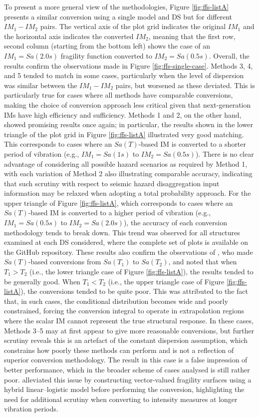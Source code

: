 To present a more general view of the methodologies, Figure \ref{fig:ffs-listA} presents a similar conversion using a single model and \ac{DS} but for different $IM_1-IM_2$ pairs. The vertical axis of the plot grid indicates the original $IM_1$ and the horizontal axis indicates the converted $IM_2$, meaning that the first row, second column (starting from the bottom left) shows the case of an $IM_1=Sa(2.0s)$ fragility function converted to $IM_2=Sa(0.5s)$. Overall, the results confirm the observations made in Figure \ref{fig:ffs-single-case}. Methods 3, 4, and 5 tended to match in some cases, particularly when the level of dispersion was similar between the $IM_1-IM_2$ pairs, but worsened as these deviated. This is particularly true for cases where all methods have comparable conversions, making the choice of conversion approach less critical given that next-generation IMs have high efficiency and sufficiency. Methods 1 and 2, on the other hand, showed promising results once again; in particular, the results shown in the lower triangle of the plot grid in Figure \ref{fig:ffs-listA} illustrated very good matching. This corresponds to cases where an $Sa(T)$-based \ac{IM} is converted to a shorter period of vibration (e.g., $IM_1=Sa(1s)$ to $IM_2=Sa(0.5s)$). There is no clear advantage of considering all possible hazard scenarios as required by Method 1, with each variation of Method 2 also illustrating comparable accuracy, indicating that such scrutiny with respect to seismic hazard disaggregation input information may be relaxed when adopting a total probability approach. For the upper triangle of Figure \ref{fig:ffs-listA}, which corresponds to cases where an $Sa(T)$-based \ac{IM} is converted to a higher period of vibration (e.g., $IM_1=Sa(0.5s)$ to $IM_2=Sa(2.0s)$), the accuracy of each conversion methodology tends to break down. This trend was observed for all structures examined at each \ac{DS} considered, where the complete set of plots is available on the GitHub repository. These results also confirm the observations of \citet{Suzuki2020}, who made $Sa(T)$-based conversions from $Sa(T_1)$ to $Sa(T_2)$, and noted that when $T_1 > T_2$ (i.e., the lower triangle case of Figure \ref{fig:ffs-listA}), the results tended to be generally good. When $T_1 < T_2$ (i.e., the upper triangle case of Figure \ref{fig:ffs-listA}), the conversions tended to be quite poor. This was attributed to the fact that, in such cases, the conditional distribution becomes wide and poorly constrained, forcing the conversion integral to operate in extrapolation regions where the scalar IM cannot represent the true structural response. In these cases, Methods 3–5 may at first appear to give more reasonable conversions, but further scrutiny reveals this is an artefact of the constant dispersion assumption, which constrains how poorly these methods can perform and is not a reflection of superior conversion methodology. The result in this case is a false impression of better performance, which in the broader scheme of cases analysed is still rather poor. \citet{Suzuki2020} alleviated this issue by constructing vector-valued fragility surfaces using a hybrid linear–logistic model before performing the conversion, highlighting the need for additional scrutiny when converting to intensity measures at longer vibration periods.


